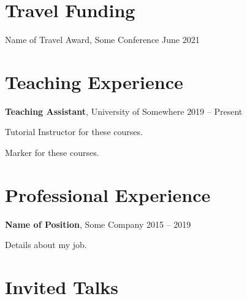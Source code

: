 \documentclass[margin,line]{res}
\newenvironment{basiclist}{
  \begin{list}{}{
      \setlength{\itemsep}{0.06in}
      \setlength{\parsep}{0in} 
      \setlength{\parskip}{0in}
      \setlength{\topsep}{0in} 
      \setlength{\partopsep}{0in} 
      \setlength{\rightmargin}{0in}
      \setlength{\leftmargin}{0in}
      }}{\end{list}
  }
\newenvironment{bullet-italic-right-stop}{
  \begin{list}{$\bullet$}{
      \setlength{\itemsep}{0.02in}
      \setlength{\parsep}{0in} 
      \setlength{\parskip}{0in}
      \setlength{\topsep}{0in} 
      \setlength{\partopsep}{0.025in} 
      \setlength{\rightmargin}{0.89in}
      \setlength{\leftmargin}{0.3in}
      \itshape
      }}{\end{list}
      \vspace*{-0.05in}
  }
\begin{document}
\begin{resume}
\section{\sc Travel Funding}
\begin{basiclist}

\item Name of Travel Award, Some Conference \hfill{June 2021}

\end{basiclist}


\section{\sc Teaching Experience}

\begin{basiclist}

\item  \textbf{Teaching Assistant}, University of Somewhere \hfill{2019 -- Present}

\begin{bullet-italic-right-stop}
\item Tutorial Instructor for these courses.
\item Marker for these courses.
\end{bullet-italic-right-stop}

\end{basiclist}


\section{\sc Professional Experience}

\begin{basiclist}

\item \textbf{Name of Position}, Some Company \hfill{2015 -- 2019}

\begin{bullet-italic-right-stop}
\item Details about my job. 
\end{bullet-italic-right-stop}

\end{basiclist}


\section{\sc Invited Talks}


\end{resume}
\end{document}
